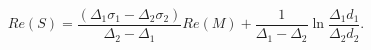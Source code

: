 \begin{equation}
Re(S) = \frac{
(\Delta_1 \sigma_1 - \Delta_2 \sigma_2)}
{\Delta_2 - \Delta_1}Re(M) + \frac{1}{\Delta_1 - \Delta_2}
\ln \frac{\Delta_1 d_1}{\Delta_2 d_2} .
\label{RT-sol-4}
\end{equation}

